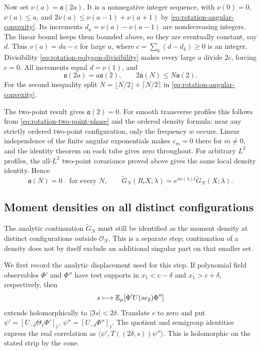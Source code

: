 Now set $\nu(a)=\mathfrak a(2a)$. It is a nonnegative integer
sequence, with $\nu(0)=0$, $\nu(a)\le a$, and
$2\nu(a)\le\nu(a-1)+\nu(a+1)$ by
\eqref{eq:rotation-angular-convexity}.
Its increments $d_a=\nu(a)-\nu(a-1)$ are nondecreasing integers.
The linear bound keeps them bounded above, so they are eventually
constant, say $d$. Thus $\nu(a)=da-c$ for large $a$, where
$c=\sum_k(d-d_k)\ge0$ is an integer.
Divisibility \eqref{eq:rotation-polygon-divisibility} makes every
large $a$ divide $2c$, forcing $c=0$.
All increments equal $d=\nu(1)$, and
\[
 \mathfrak a(2a)=a\mathfrak a(2),\qquad
 2\mathfrak a(N)\le N\mathfrak a(2).
\]
For the second inequality split $N=\lfloor N/2\rfloor+
\lceil N/2\rceil$ in \eqref{eq:rotation-angular-convexity}.

The two-point result gives $\mathfrak a(2)=0$.
For smooth transverse profiles this follows from
\eqref{eq:rotation-two-point-phase} and the ordered density formula:
near any strictly ordered two-point configuration, only the
frequency $w$ occurs. Linear independence of the finite angular
exponentials makes $c_m=0$ there for $m\ne0$, and the identity
theorem on each tube gives zero throughout.
For arbitrary $L^2$ profiles, the all-$L^2$ two-point covariance
proved above gives the same local density identity.
Hence
\begin{equation}\label{eq:rotation-no-extra-angular-coefficients}
 \mathfrak a(N)=0\quad\text{for every }N,\qquad
 \widetilde G_N(R_tX;\lambda)=e^{iw(\lambda)t}
                                  \widetilde G_N(X;\lambda).
\end{equation}

\subsection{Moment densities on all distinct configurations}
\label{subsec:rotation-all-distinct-density}

The analytic continuation $\widetilde G_N$ must still be
identified as the moment density at distinct configurations
outside $\mathcal O_N$. This is a separate step; continuation
of a density does not by itself exclude an additional singular
part on that smaller set.

We first record the analytic displacement used for this step.
If polynomial field observables $\Phi'$ and $\Phi''$ have test
supports in $x_1<c-\delta$ and $x_1>c+\delta$, respectively,
then
\[
 s\longmapsto\mathbb E_\mu[\Phi'U(se_2)\Phi'']
\]
extends holomorphically to $|\Im s|<2\delta$.
Translate $c$ to zero and put
$\psi'=[U_{-\delta}\Theta_1\Phi']_1$,
$\psi''=[U_{-\delta}\Phi'']_1$.
The quotient and semigroup identities express the real
correlation as
$\langle\psi',T((2\delta,s))\psi''\rangle$.
This is holomorphic on the stated strip by the cone.

